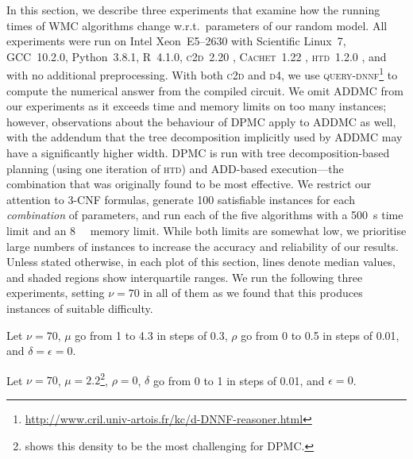 In this section, we describe three experiments that examine how the running
times of \textsf{WMC} algorithms change w.r.t.\ parameters of our random model.
All experiments were run on Intel Xeon~E5--2630 with Scientific Linux~7,
GCC~10.2.0, Python~3.8.1, R~4.1.0,
\textsc{c2d}~2.20 \citep{DBLP:conf/ecai/Darwiche04},
\textsc{Cachet}~1.22 \citep{DBLP:conf/sat/SangBBKP04},
\textsc{htd}~1.2.0 \citep{DBLP:conf/cpaior/AbseherMW17}, and with no additional preprocessing. With both \textsc{c2d} and \textsc{d4}, we use \textsc{query-dnnf}\footnote{\url{http://www.cril.univ-artois.fr/kc/d-DNNF-reasoner.html}} to compute the numerical answer from the compiled circuit. We omit \textsc{ADDMC} \citep{DBLP:conf/aaai/DudekPV20} from our experiments as it exceeds time and memory limits on too many instances; however, observations about the behaviour of \textsc{DPMC} \citep{DBLP:conf/cp/DudekPV20} apply to \textsc{ADDMC} as well, with the addendum that the tree decomposition implicitly used by \textsc{ADDMC} may have a significantly higher width. \textsc{DPMC} is run with tree decomposition-based planning (using one iteration of \textsc{htd}) and ADD-based execution---the combination that was originally found to be most effective. We restrict our attention to 3-CNF formulas, generate 100 satisfiable instances for each \emph{combination} of parameters, and run each of the five algorithms with a \SI{500}{\second} time limit and an \SI{8}{\gibi\byte} memory limit. While both limits are somewhat low, we prioritise large numbers of instances to increase the accuracy and reliability of our results. Unless stated otherwise, in each plot of this section, lines denote median values, and shaded regions show interquartile ranges. We run the following three experiments, setting $\nu = 70$ in all of them as we found that this produces instances of suitable difficulty.

\begin{experiment}\label{exp:density}
  Let $\nu = 70$, $\mu$ go from 1 to 4.3 in steps of 0.3, $\rho$ go from 0 to
  0.5 in steps of 0.01, and $\delta = \epsilon = 0$.
\end{experiment}

\begin{experiment}[$\delta$]\label{exp:delta}
  Let $\nu = 70$, $\mu = 2.2$\footnote{ shows this density to
    be the most challenging for \textsc{DPMC}.},
  $\rho = 0$, $\delta$ go from 0 to 1 in steps of 0.01, and $\epsilon = 0$.
\end{experiment}

